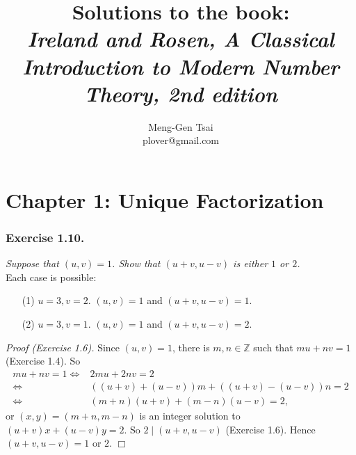 \documentclass{article}
\title{\textbf{Solutions to the book: \\
\emph{Ireland and Rosen, A Classical Introduction to Modern Number Theory, 2nd edition}}}
\author{Meng-Gen Tsai \\ plover@gmail.com}
\begin{document}
\maketitle
\tableofcontents












\newpage
\section*{Chapter 1: Unique Factorization \\}



\subsubsection*{Exercise 1.10.}
\emph{Suppose that $(u,v)=1$.
Show that $(u+v,u-v)$ is either $1$ or $2$.} \\

Each case is possible:
\begin{enumerate}
  \item[(1)]
  $u=3, v=2$. $(u,v)=1$ and $(u+v,u-v)=1$.
  \item[(2)]
  $u=3, v=1$. $(u,v)=1$ and $(u+v,u-v)=2$. \\
\end{enumerate}

\emph{Proof (Exercise 1.6).}
Since $(u,v)=1$, there is $m, n \in \mathbb{Z}$ such that $mu+nv=1$ (Exercise 1.4).
So
\begin{align*}
mu+nv=1
\Longleftrightarrow& 2mu+2nv=2 \\
\Longleftrightarrow& ((u+v) + (u-v))m + ((u+v)-(u-v))n = 2 \\
\Longleftrightarrow& (m+n)(u+v) + (m-n)(u-v) = 2,
\end{align*}
or $(x,y)=(m+n,m-n)$ is an integer solution to $(u+v)x + (u-v)y = 2$.
So $2 \mid (u+v, u-v)$ (Exercise 1.6).
Hence $(u+v, u-v) = 1$ or $2$.
$\Box$ \\\\
\end{document}

